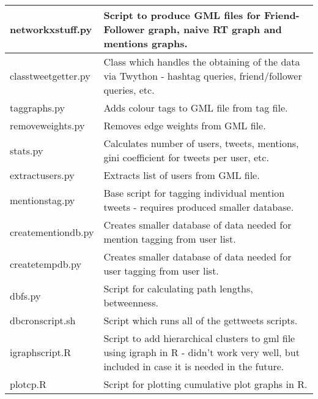\documentclass[paper=a4, fontsize=11pt]{scrartcl}
\numberwithin{equation}{section}		%
\numberwithin{figure}{section}			%
\numberwithin{table}{section}				%
\begin{document}
\begin{tabular}{l | p{11cm}}
networkxstuff.py & Script to produce GML files for Friend-Follower graph, naive RT graph and mentions graphs.\\\hline
classtweetgetter.py & Class which handles the obtaining of the data via Twython - hashtag queries, friend/follower queries, etc.\\\hline
taggraphs.py & Adds colour tags to GML file from tag file.\\\hline
removeweights.py & Removes edge weights from GML file.\\\hline
stats.py & Calculates number of users, tweets, mentions, gini coefficient for tweets per user, etc.\\\hline
extractusers.py & Extracts list of users from GML file.\\\hline
mentionstag.py & Base script for tagging individual mention tweets - requires produced smaller database.\\\hline
creatementiondb.py & Creates smaller database of data needed for mention tagging from user list.\\\hline
createtempdb.py & Creates smaller database of data needed for user tagging from user list.\\\hline
dbfs.py & Script for calculating path lengths, betweenness.\\\hline
dbcronscript.sh & Script which runs all of the gettweets scripts.\\\hline
igraphscript.R & Script to add hierarchical clusters to gml file using igraph in R - didn't work very well, but included in case it is needed in the future.\\\hline
plotcp.R & Script for plotting cumulative plot graphs in R.\\
\end{tabular}
\end{document}
